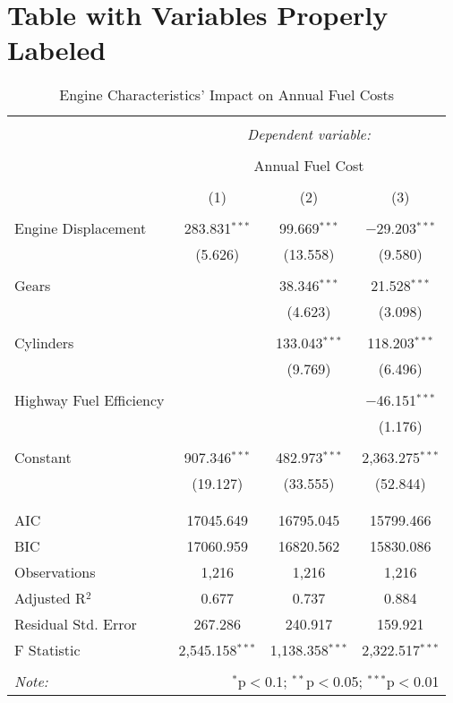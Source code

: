 \documentclass{article}
\begin{document}
\newpage
\section{Table with Variables Properly Labeled}

\begin{table}[!htbp] \centering 
  \caption{Engine Characteristics' Impact on Annual Fuel Costs} 
  \label{} 
\begin{tabular}{@{\extracolsep{5pt}}lccc} 
\\[-1.8ex]\hline 
\hline \\[-1.8ex] 
 & \multicolumn{3}{c}{\textit{Dependent variable:}} \\ 
\cline{2-4} 
\\[-1.8ex] & \multicolumn{3}{c}{Annual Fuel Cost} \\ 
\\[-1.8ex] & (1) & (2) & (3)\\ 
\hline \\[-1.8ex] 
 Engine Displacement & 283.831$^{***}$ & 99.669$^{***}$ & $-$29.203$^{***}$ \\ 
  & (5.626) & (13.558) & (9.580) \\ 
  & & & \\ 
 Gears &  & 38.346$^{***}$ & 21.528$^{***}$ \\ 
  &  & (4.623) & (3.098) \\ 
  & & & \\ 
 Cylinders &  & 133.043$^{***}$ & 118.203$^{***}$ \\ 
  &  & (9.769) & (6.496) \\ 
  & & & \\ 
 Highway Fuel Efficiency &  &  & $-$46.151$^{***}$ \\ 
  &  &  & (1.176) \\ 
  & & & \\ 
 Constant & 907.346$^{***}$ & 482.973$^{***}$ & 2,363.275$^{***}$ \\ 
  & (19.127) & (33.555) & (52.844) \\ 
  & & & \\ 
\hline \\[-1.8ex] 
AIC & 17045.649 & 16795.045 & 15799.466 \\ 
BIC & 17060.959 & 16820.562 & 15830.086 \\ 
Observations & 1,216 & 1,216 & 1,216 \\ 
Adjusted R$^{2}$ & 0.677 & 0.737 & 0.884 \\ 
Residual Std. Error & 267.286 & 240.917 & 159.921 \\ 
F Statistic & 2,545.158$^{***}$ & 1,138.358$^{***}$ & 2,322.517$^{***}$ \\ 
\hline 
\hline \\[-1.8ex] 
\textit{Note:}  & \multicolumn{3}{r}{$^{*}$p$<$0.1; $^{**}$p$<$0.05; $^{***}$p$<$0.01} \\ 
\end{tabular} 
\end{table} 
\end{document}
